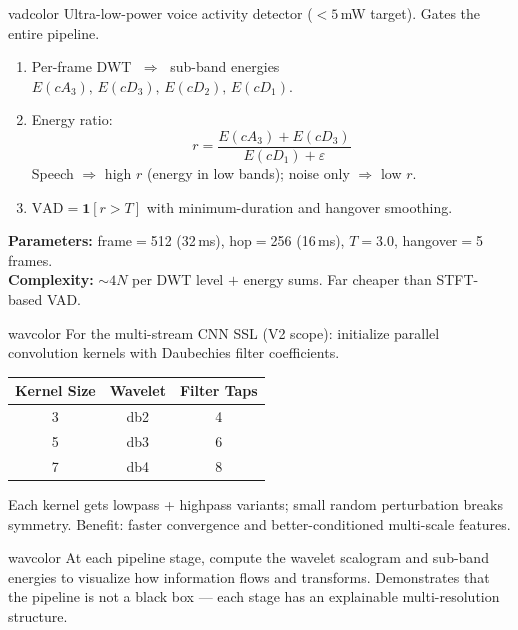 \documentclass[11pt,a4paper]{article}
\begin{document}
\begin{modulebox}{vadcolor}
Ultra-low-power voice activity detector ($<5$\,mW target). Gates the entire pipeline.

\begin{enumerate}[nosep]
\item Per-frame DWT $\;\Rightarrow\;$ sub-band energies $E(cA_3),\,E(cD_3),\,E(cD_2),\,E(cD_1)$.
\item Energy ratio:
\begin{equation}
r = \frac{E(cA_3) + E(cD_3)}{E(cD_1) + \varepsilon}
\end{equation}
Speech $\Rightarrow$ high $r$ (energy in low bands); noise only $\Rightarrow$ low $r$.
\item $\text{VAD} = \mathbf{1}[r > T]$ with minimum-duration and hangover smoothing.
\end{enumerate}

\noindent\textbf{Parameters:} frame$=$512 (32\,ms), hop$=$256 (16\,ms), $T=3.0$, hangover$=$5 frames.\\
\textbf{Complexity:} $\sim\!4N$ per DWT level $+$ energy sums. Far cheaper than STFT-based VAD.
\end{modulebox}

\begin{modulebox}{wavcolor}
For the multi-stream CNN SSL (V2 scope): initialize parallel convolution kernels with Daubechies filter coefficients.

\smallskip
\begin{center}
\begin{tabular}{ccc}
\toprule
\textbf{Kernel Size} & \textbf{Wavelet} & \textbf{Filter Taps}\\
\midrule
3 & db2 & 4\\
5 & db3 & 6\\
7 & db4 & 8\\
\bottomrule
\end{tabular}
\end{center}

Each kernel gets lowpass + highpass variants; small random perturbation breaks symmetry.
Benefit: faster convergence and better-conditioned multi-scale features.
\end{modulebox}

\begin{modulebox}{wavcolor}
At each pipeline stage, compute the wavelet scalogram and sub-band energies to visualize how information flows and transforms. Demonstrates that the pipeline is not a black box --- each stage has an explainable multi-resolution structure.
\end{modulebox}
\end{document}
